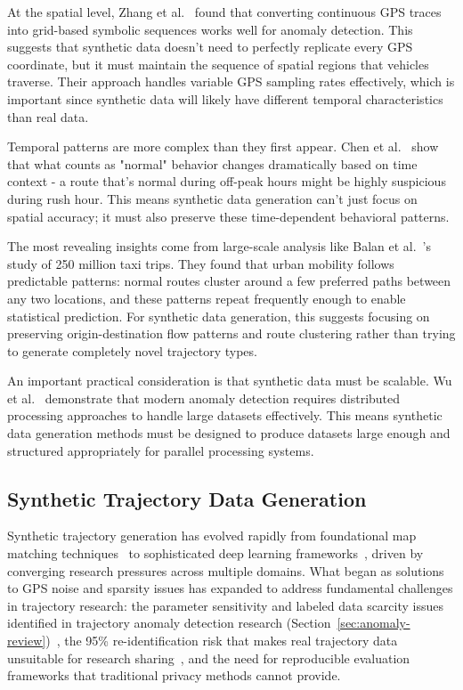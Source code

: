 \documentclass[runningheads]{llncs}
\begin{document}
At the spatial level, Zhang et al.~\cite{zhang2019ibat} found that converting continuous GPS traces into grid-based symbolic sequences works well for anomaly detection. This suggests that synthetic data doesn't need to perfectly replicate every GPS coordinate, but it must maintain the sequence of spatial regions that vehicles traverse. Their approach handles variable GPS sampling rates effectively, which is important since synthetic data will likely have different temporal characteristics than real data.

Temporal patterns are more complex than they first appear. Chen et al.~\cite{chen2021temporal} show that what counts as "normal" behavior changes dramatically based on time context - a route that's normal during off-peak hours might be highly suspicious during rush hour. This means synthetic data generation can't just focus on spatial accuracy; it must also preserve these time-dependent behavioral patterns.

The most revealing insights come from large-scale analysis like Balan et al.~\cite{balan2011real}'s study of 250 million taxi trips. They found that urban mobility follows predictable patterns: normal routes cluster around a few preferred paths between any two locations, and these patterns repeat frequently enough to enable statistical prediction. For synthetic data generation, this suggests focusing on preserving origin-destination flow patterns and route clustering rather than trying to generate completely novel trajectory types.

An important practical consideration is that synthetic data must be scalable. Wu et al.~\cite{wu2024safety} demonstrate that modern anomaly detection requires distributed processing approaches to handle large datasets effectively. This means synthetic data generation methods must be designed to produce datasets large enough and structured appropriately for parallel processing systems.

\subsection{Synthetic Trajectory Data Generation}
\label{sec:generation-review}

Synthetic trajectory generation has evolved rapidly from foundational map matching techniques~\cite{newson2009hidden} to sophisticated deep learning frameworks~\cite{cao2021generating,wang2025gtg}, driven by converging research pressures across multiple domains. What began as solutions to GPS noise and sparsity issues has expanded to address fundamental challenges in trajectory research: the parameter sensitivity and labeled data scarcity issues identified in trajectory anomaly detection research (Section~\ref{sec:anomaly-review})~\cite{zhang2019ibat}, the 95\% re-identification risk that makes real trajectory data unsuitable for research sharing~\cite{rao2023cats}, and the need for reproducible evaluation frameworks that traditional privacy methods cannot provide.
\end{document}
